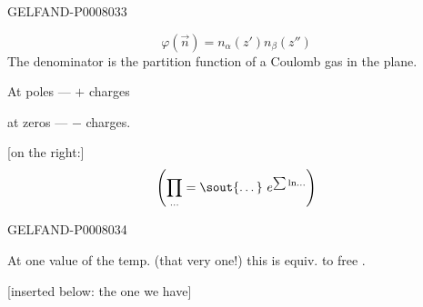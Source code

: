 \begin{GelfandAdjacentEvidence}{GELFAND-P000803}{3}

\[
\varphi(\vec n)=n_\alpha(z')n_\beta(z'')
\]
The denominator is the partition function of a Coulomb gas in the plane.

At poles --- \(+\) charges

\hspace{1em}at zeros --- \(-\) charges.

[on the right:]
\[
\left(\prod_{\ldots}=\text{\sout{\ldots}}\ e^{\sum\ln\ldots}\right)
\]
\end{GelfandAdjacentEvidence}
\begin{GelfandAdjacentEvidence}{GELFAND-P000803}{4}


At one value of the temp. (that very one!) this is equiv. to free .

[inserted below: the one we have]
\end{GelfandAdjacentEvidence}



